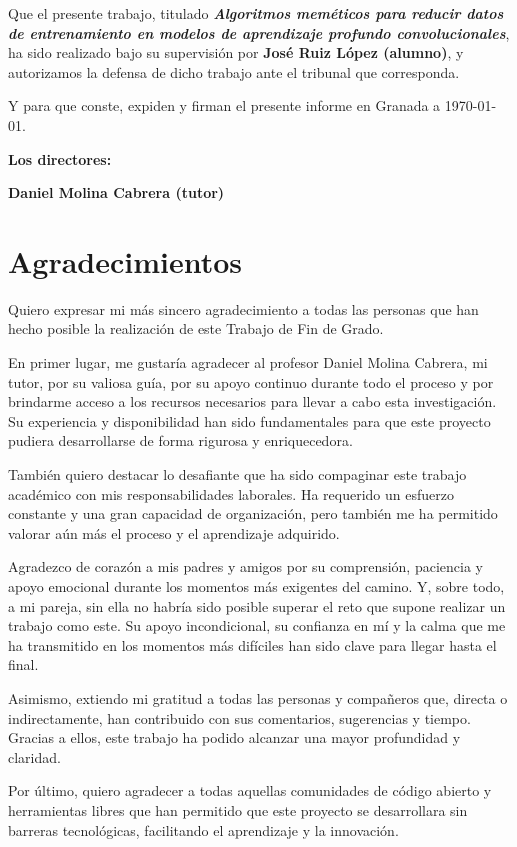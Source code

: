 Que el presente trabajo, titulado \textit{\textbf{Algoritmos meméticos para reducir datos de entrenamiento en modelos de aprendizaje profundo convolucionales}},
ha sido realizado bajo su supervisión por \textbf{José Ruiz López (alumno)}, y autorizamos la defensa de dicho trabajo  ante el tribunal que corresponda.

\vspace{0.5cm}

Y para que conste, expiden y firman el presente informe en Granada a \today.

\vspace{1cm}

\textbf{Los directores:}

\vspace{5cm}

\noindent \textbf{Daniel Molina Cabrera (tutor)}

\chapter*{Agradecimientos}
\thispagestyle{empty}

\vspace{1cm}


Quiero expresar mi más sincero agradecimiento a todas las personas que han hecho posible la realización de este Trabajo de Fin de Grado.

En primer lugar, me gustaría agradecer al profesor Daniel Molina Cabrera, mi tutor, por su valiosa guía, por su apoyo continuo durante 
todo el proceso y por brindarme acceso a los recursos necesarios para llevar a cabo esta investigación.
Su experiencia y disponibilidad han sido fundamentales para que este proyecto pudiera desarrollarse de forma rigurosa y enriquecedora.

También quiero destacar lo desafiante que ha sido compaginar este trabajo académico con mis responsabilidades laborales.
Ha requerido un esfuerzo constante y una gran capacidad de organización, pero también me ha permitido valorar aún más el proceso y el aprendizaje adquirido.

Agradezco de corazón a mis padres y amigos por su comprensión, paciencia y apoyo emocional durante los momentos más exigentes del camino.
Y, sobre todo, a mi pareja, sin ella no habría sido posible superar el reto que supone realizar un trabajo como este. 
Su apoyo incondicional, su confianza en mí y la calma que me ha transmitido en los momentos más difíciles han sido clave para llegar hasta el final.

Asimismo, extiendo mi gratitud a todas las personas y compañeros que, directa o indirectamente, han contribuido con sus comentarios, sugerencias y tiempo.
Gracias a ellos, este trabajo ha podido alcanzar una mayor profundidad y claridad.

Por último, quiero agradecer a todas aquellas comunidades de código abierto y herramientas libres que han permitido que este proyecto se 
desarrollara sin barreras tecnológicas, facilitando el aprendizaje y la innovación.
